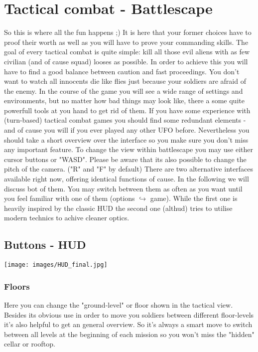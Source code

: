 \section{Tactical combat - Battlescape}

So this is where all the fun happens ;) It is here that your former choices have to proof their worth as well as you will have to prove your commanding skills.
The goal of every tactical combat is quite simple: kill all those evil aliens with as few civilian (and of cause squad) looses as possible. In order to achieve this you will have to find a good balance between caution and fast proceedings. You don't want to watch all innocents die like flies just because your soldiers are afraid of the enemy.
In the course of the game you will see a wide range of settings and environments, but no matter how bad things may look like, there a some quite powerfull tools at you hand to get rid of them. If you have some experience with (turn-based) tactical combat games you should find some redundant elements - and of cause you will if you ever played any other UFO before. Nevertheless you should take a short overview over the interface so you make sure you don't miss any important feature. To change the view within battlescape you may use either cursor buttons or "WASD". Please be aware that its also possible to change the pitch of the camera. ("R" and "F" by default)
There are two alternative interfaces available right now, offering identical functions of cause. In the following we will discuss bot of them. You may switch between them as often as you want until you feel familiar with one of them (options $\hookrightarrow$ game).
While the first one is heavily inspired by the classic HUD the second one (althud) tries to utilise modern technics to achive cleaner optics.

\subsection{Buttons - HUD}
\texttt{[image: images/HUD\_final.jpg]}
\subsubsection{Floors}
Here you can change the "ground-level" or floor shown in the tactical view. Besides its obvious use in order to move you soldiers between different floor-levels it's also helpful to get an general overview. So it's always a smart move to switch between all levels at the beginning of each mission so you won't miss the "hidden" cellar or rooftop.
